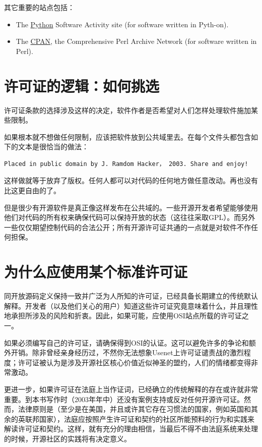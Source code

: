 \documentclass[12pt,oneside]{book}
\begin{document}
其它重要的站点包括：
\begin{itemize}
\item The \href{http://www.python.org/}{Python} Software Activity site (for software written in Pyth-on).
\item The \href{http://language.perl.com/CPAN}{CPAN}, the Comprehensive Perl Archive Network (for software written in Perl).
\end{itemize}

\section{许可证的逻辑：如何挑选}
许可证条款的选择涉及这样的决定，软件作者是否希望对人们怎样处理软件施加某些限制。

如果根本就不想做任何限制，应该把软件放到公共域里去。在每个文件头都包含如下的文本是很恰当的做法：
\begin{Verbatim}
Placed in public domain by J. Ramdom Hacker， 2003. Share and enjoy!
\end{Verbatim}

这样做就等于放弃了版权。任何人都可以对代码的任何地方做任意改动。再也没有比这更自由的了。

但是很少有开源软件是真正像这样发布在公共域的。一些开源开发者希望能够使用他们对代码的所有权来确保代码可以保持开放的状态（这往往采取GPL）。而另外一些仅仅期望控制代码的合法公开；所有开源许可证共通的一点就是对软件不作任何担保。

\section{为什么应使用某个标准许可证}
同开放源码定义保持一致并广泛为人所知的许可证，已经具备长期建立的传统默认解释。开发者（以及他们关心的用户）知道这些许可证究竟意味着什么，并且理性地承担所涉及的风险和折衷。因此，如果可能，应使用OSI站点所载的许可证之一。

如果必须编写自己的许可证，请确保得到OSI的认证。这可以避免许多的争论和额外开销。除非曾经亲身经历过，不然你无法想象Usenet上许可证谴责战的激烈程度；许可证被认为是涉及开源社区核心价值近似神圣的盟约，人们的情绪都变得非常激动。

更进一步，如果许可证在法庭上当作证词，已经确立的传统解释的存在或许就非常重要。到本书写作时（2003年年中）还没有案例支持或反对任何开源许可证。然而，法律原则是（至少是在美国，并且或许其它存在习惯法的国家，例如英国和其余的英联邦国家），法庭应按照产生许可证和契约的社区所能预料的行为和实践来解读许可证和契约。这样，就有充分的理由相信，当最后不得不由法庭系统来处理的时候，开源社区的实践将有决定意义。
\end{document}
